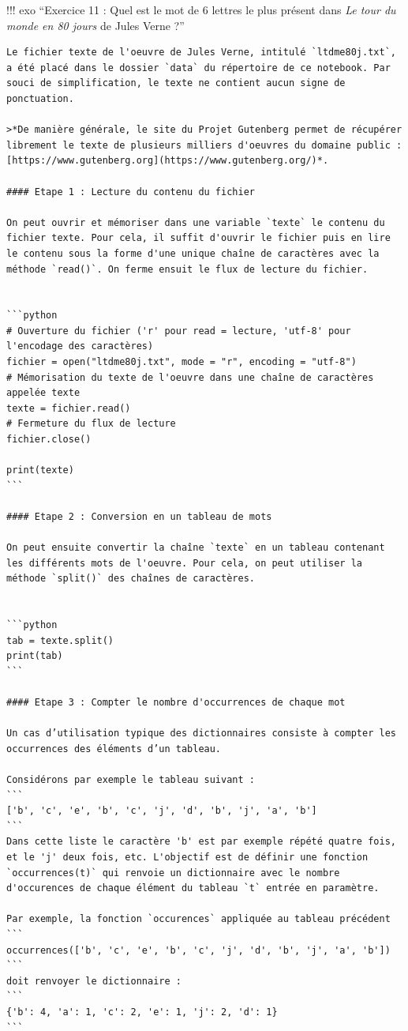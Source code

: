 \documentclass[
]{article}
\begin{document}
!!! exo ``Exercice 11 : Quel est le mot de 6 lettres le plus présent
dans \emph{Le tour du monde en 80 jours} de Jules Verne ?''

\begin{verbatim}
Le fichier texte de l'oeuvre de Jules Verne, intitulé `ltdme80j.txt`, a été placé dans le dossier `data` du répertoire de ce notebook. Par souci de simplification, le texte ne contient aucun signe de ponctuation. 

>*De manière générale, le site du Projet Gutenberg permet de récupérer librement le texte de plusieurs milliers d'oeuvres du domaine public : [https://www.gutenberg.org](https://www.gutenberg.org/)*.

#### Etape 1 : Lecture du contenu du fichier

On peut ouvrir et mémoriser dans une variable `texte` le contenu du fichier texte. Pour cela, il suffit d'ouvrir le fichier puis en lire le contenu sous la forme d'une unique chaîne de caractères avec la méthode `read()`. On ferme ensuit le flux de lecture du fichier.


```python
# Ouverture du fichier ('r' pour read = lecture, 'utf-8' pour l'encodage des caractères)
fichier = open("ltdme80j.txt", mode = "r", encoding = "utf-8") 
# Mémorisation du texte de l'oeuvre dans une chaîne de caractères appelée texte
texte = fichier.read() 
# Fermeture du flux de lecture
fichier.close() 

print(texte)
```

#### Etape 2 : Conversion en un tableau de mots

On peut ensuite convertir la chaîne `texte` en un tableau contenant les différents mots de l'oeuvre. Pour cela, on peut utiliser la méthode `split()` des chaînes de caractères.


```python
tab = texte.split()
print(tab)
```

#### Etape 3 : Compter le nombre d'occurrences de chaque mot

Un cas d’utilisation typique des dictionnaires consiste à compter les occurrences des éléments d’un tableau.

Considérons par exemple le tableau suivant :
```
['b', 'c', 'e', 'b', 'c', 'j', 'd', 'b', 'j', 'a', 'b']
```
Dans cette liste le caractère 'b' est par exemple répété quatre fois, et le 'j' deux fois, etc. L'objectif est de définir une fonction `occurrences(t)` qui renvoie un dictionnaire avec le nombre d'occurences de chaque élément du tableau `t` entrée en paramètre.

Par exemple, la fonction `occurences` appliquée au tableau précédent
```
occurrences(['b', 'c', 'e', 'b', 'c', 'j', 'd', 'b', 'j', 'a', 'b'])
```
doit renvoyer le dictionnaire :
```
{'b': 4, 'a': 1, 'c': 2, 'e': 1, 'j': 2, 'd': 1}
```


\end{verbatim}
\end{document}
